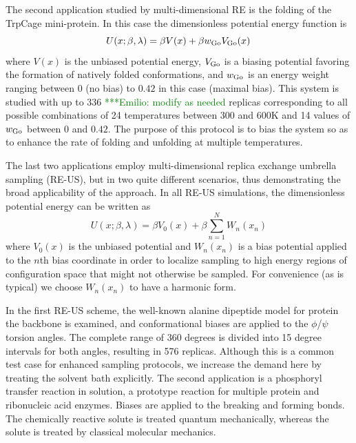 \documentclass{sig-alternate}
\newcommand{\egnote}[1]{ {\textcolor{green} { ***Emilio: #1 }}}
\begin{document}
The second application studied by multi-dimensional RE is the folding of the 
TrpCage mini-protein. In this case the dimensionless potential energy function 
is
\begin{equation}
U(x;\beta,\lambda) = \beta V(x) + \beta w_{\rm Go} V_{\rm Go}(x) \,
\end{equation}
where $V(x)$ is the unbiased potential energy, $V_{\rm Go}$ is a biasing 
potential favoring the formation of natively folded conformations,\cite{pogorelov2004variations} and 
$w_{\rm Go}$ is an energy weight ranging between 0 (no bias) to $0.42$ in this 
case (maximal bias). This system is studied with up to 336 \egnote{modify as 
  needed} replicas corresponding to all possible combinations of 24 
temperatures between 300 and 600K and 14 values of  $w_{\rm Go}$ between 0 and 
$0.42$. The purpose of this protocol is to bias the system so as to enhance the
rate of folding and unfolding at multiple temperatures.

The last two applications employ multi-dimensional replica exchange umbrella 
sampling (RE-US), but in two quite different scenarios, thus demonstrating the 
broad applicability of the approach.  In all RE-US simulations, the 
dimensionless potential energy can be written as
\begin{equation}
U(x;\beta,\lambda) = \beta V_0(x) + \beta \sum_{n=1}^N W_n(x_n)
\end{equation}
where $V_0(x)$ is the unbiased potential and $W_n(x_n)$ is a bias potential 
applied to the $n$th bias coordinate in order to localize sampling to high 
energy regions of configuration space that might not otherwise be sampled. For 
convenience (as is typical) we choose $W_n(x_n)$ to have a harmonic form. 

In the first RE-US scheme, the well-known alanine dipeptide model for protein 
the backbone is examined, and conformational biases are applied to the 
$\phi$/$\psi$ torsion angles. The complete range of 360 degrees is divided into
15 degree intervals for both angles, resulting in 576 replicas. Although this 
is a common test case for enhanced sampling protocols, we increase the demand 
here by treating the solvent bath explicitly. The second application is a 
phosphoryl transfer reaction in solution, a prototype reaction for multiple 
protein and ribonucleic acid enzymes. Biases are applied to the breaking and
forming bonds. The chemically reactive solute is treated quantum mechanically, 
whereas the solute is treated by classical molecular mechanics. 
\end{document}
